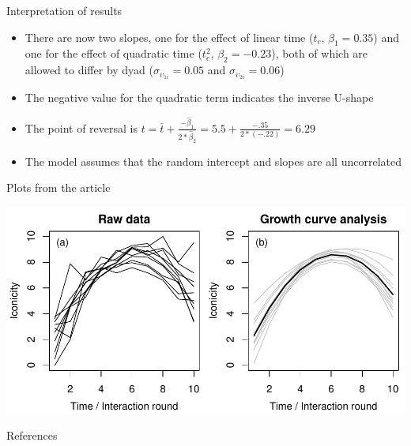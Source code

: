 \documentclass[aspectratio=169]{beamer}
\begin{document}
\begin{frame}{Interpretation of results}
\begin{itemize}
  \item There are now two slopes, one for the effect of linear time ($t_c$,
  $\beta_1 = 0.35$) and one for the effect of quadratic time ($t_c^2$,
  $\beta_2 = -0.23$), both of which are allowed to differ by dyad
  ($\sigma_{\upsilon_{1i}} = 0.05$ and $\sigma_{\upsilon_{2i}} = 0.06$)
  \item The negative value for the quadratic term indicates the inverse
  U-shape
  \item The point of reversal is $t = \bar t + \frac{-\hat\beta_1}{2*\hat\beta_2} =
  5.5 + \frac{-.35}{2*(-.22)} = 6.29$ \item The model assumes that the
  random intercept and slopes are all
  uncorrelated
\end{itemize}
\end{frame}

\begin{frame}{Plots from the article}
\begin{center}
\includegraphics[scale=.66]{../figures/icon-both}
\end{center}
\end{frame}

% 
% 

\appendix

\begin{frame}{References}
  \printbibliography
  \vfill
\end{frame}
 
\end{document}
